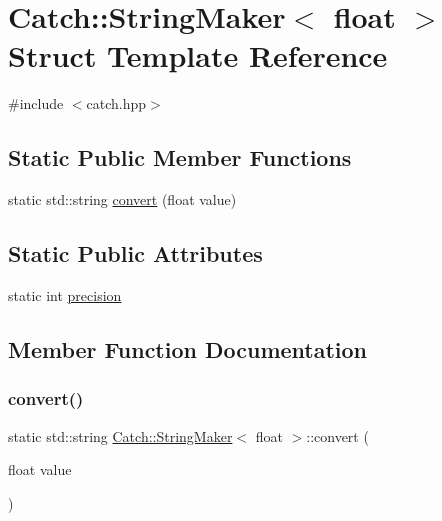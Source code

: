 \hypertarget{struct_catch_1_1_string_maker_3_01float_01_4}{}\section{Catch\+:\+:String\+Maker$<$ float $>$ Struct Template Reference}
\label{struct_catch_1_1_string_maker_3_01float_01_4}


{\ttfamily \#include $<$catch.\+hpp$>$}

\subsection*{Static Public Member Functions}
\begin{DoxyCompactItemize}
\item 
static std\+::string \mbox{\hyperlink{struct_catch_1_1_string_maker_3_01float_01_4_a7ffacc6fa46a338200f3fbb2ee078648}{convert}} (float value)
\end{DoxyCompactItemize}
\subsection*{Static Public Attributes}
\begin{DoxyCompactItemize}
\item 
static int \mbox{\hyperlink{struct_catch_1_1_string_maker_3_01float_01_4_a54ebebe76a755dbe2dd8ad409c329378}{precision}}
\end{DoxyCompactItemize}


\subsection{Member Function Documentation}
\mbox{\label{struct_catch_1_1_string_maker_3_01float_01_4_a7ffacc6fa46a338200f3fbb2ee078648}} 
\subsubsection{\texorpdfstring{convert()}{convert()}}
{\footnotesize\ttfamily static std\+::string \mbox{\hyperlink{struct_catch_1_1_string_maker}{Catch\+::\+String\+Maker}}$<$ float $>$\+::convert (\begin{DoxyParamCaption}\item[{float}]{value }\end{DoxyParamCaption})\hspace{0.3cm}{\ttfamily [static]}}



